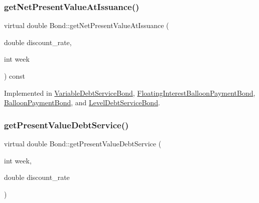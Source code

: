 \mbox{\label{classBond_a5997278813deb16aa5d01bbca8ecc7b2}} 
\subsubsection{\texorpdfstring{get\+Net\+Present\+Value\+At\+Issuance()}{getNetPresentValueAtIssuance()}}
{\footnotesize\ttfamily virtual double Bond\+::get\+Net\+Present\+Value\+At\+Issuance (\begin{DoxyParamCaption}\item[{double}]{discount\+\_\+rate,  }\item[{int}]{week }\end{DoxyParamCaption}) const\hspace{0.3cm}{\ttfamily [pure virtual]}}



Implemented in \mbox{\hyperlink{classVariableDebtServiceBond_a8cc7ee442d788b91b8c00e6bed07644d}{Variable\+Debt\+Service\+Bond}}, \mbox{\hyperlink{classFloatingInterestBalloonPaymentBond_a90205e26e09eef1227f8c0671ca4fce2}{Floating\+Interest\+Balloon\+Payment\+Bond}}, \mbox{\hyperlink{classBalloonPaymentBond_abbfaae70e003f057ec842d3889138345}{Balloon\+Payment\+Bond}}, and \mbox{\hyperlink{classLevelDebtServiceBond_a0f5820c3e76b8b908dbe153a8291d96a}{Level\+Debt\+Service\+Bond}}.

\mbox{\label{classBond_a322d4ab0c0c72824ac4df5df80f14d24}} 
\subsubsection{\texorpdfstring{get\+Present\+Value\+Debt\+Service()}{getPresentValueDebtService()}}
{\footnotesize\ttfamily virtual double Bond\+::get\+Present\+Value\+Debt\+Service (\begin{DoxyParamCaption}\item[{int}]{week,  }\item[{double}]{discount\+\_\+rate }\end{DoxyParamCaption})\hspace{0.3cm}{\ttfamily [pure virtual]}}



